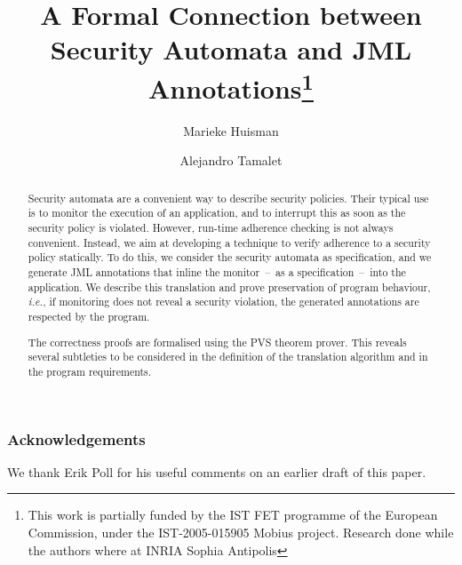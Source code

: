 \documentclass[]{llncs}
\title{A Formal Connection between Security Automata and JML 
Annotations\thanks{This work is partially funded by the IST FET
programme of the European Commission, under the IST-2005-015905
\textsf{Mobius} project. Research done while the authors where at INRIA Sophia
Antipolis}}
\author{Marieke Huisman\inst{1}
 \and Alejandro Tamalet\inst{2}}
\institute{University of Twente, Netherlands \and
University of Nijmegen, Netherlands}
\begin{document}
\maketitle
\begin{abstract}
Security automata are a convenient way to describe security
policies. Their typical use is to monitor the execution of an
application, and to interrupt this as soon as the security policy is
violated. However, run-time adherence checking is not always
convenient. Instead, we aim at developing a technique to verify
adherence to a security policy statically.  To do this, we consider
the security automata as specification, and we generate JML
annotations that inline the monitor~--~as a specification~--~into the
application.  We describe this translation and prove preservation of
program behaviour, \emph{i.e.}, if monitoring does not reveal a
security violation, the generated annotations are respected by the
program.

The correctness proofs are formalised using the PVS theorem prover.
This reveals several subtleties to be considered in the definition of the
translation algorithm and in the program requirements.
\end{abstract}









\vspace*{-1em}



\subsubsection*{Acknowledgements}
We thank Erik Poll for his useful comments on an earlier draft of this paper.
\end{document}
